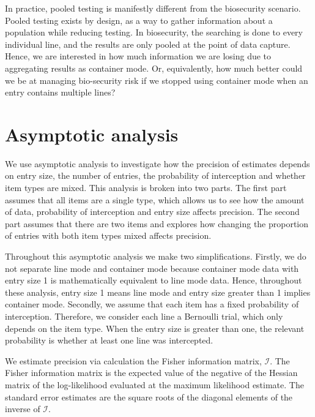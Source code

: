 \documentclass{article}
\begin{document}
In practice, pooled testing is manifestly different from the biosecurity scenario. Pooled testing exists by design, as a way to gather information about a population while reducing testing. In biosecurity, the searching is done to every individual line, and the results are only pooled at the point of data capture. Hence, we are interested in how much information we are losing due to aggregating results as container mode. Or, equivalently, how much better could we be at managing bio-security risk if we stopped using container mode when an entry contains multiple lines?



\section{Asymptotic analysis}
We use asymptotic analysis to investigate how the precision of estimates depends on entry size, the number of entries, the probability of interception and whether item types are mixed. This analysis is broken into two parts. The first part assumes that all items are a single type, which allows us to see how the amount of data, probability of interception and entry size affects precision. The second part assumes that there are two items and explores how changing the proportion of entries with both item types mixed affects precision.

Throughout this asymptotic analysis we make two simplifications. Firstly, we do not separate line mode and container mode because container mode data with entry size 1 is mathematically equivalent to line mode data. Hence, throughout these analysis, entry size 1 means line mode and entry size greater than 1 implies container mode. Secondly, we  assume that each item has a fixed probability of interception. Therefore, we consider each line a Bernoulli trial, which only depends on the item type. When the entry size is greater than one, the relevant probability is whether at least one line was intercepted.

We estimate precision via calculation the Fisher information matrix, \(\mathcal{I}\). The Fisher information  matrix is the expected value of the negative of the Hessian matrix of the log-likelihood evaluated at the maximum likelihood estimate. The standard error estimates are the square roots of the diagonal elements of the inverse of \(\mathcal{I}\).
\end{document}
